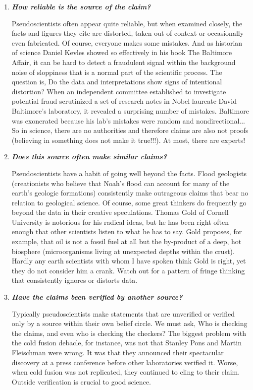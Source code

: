 	\begin{enumerate}
		\item \textit{\textbf{How reliable is the source of the claim?}}

		Pseudoscientists often appear quite reliable, but when examined closely, the facts and figures they cite are distorted, taken out of context or occasionally even fabricated. Of course, everyone makes some mistakes. And as historian of science Daniel Kevles showed so effectively in his book The Baltimore Affair, it can be hard to detect a fraudulent signal within the background noise of sloppiness that is a normal part of the scientific process. The question is, Do the data and interpretations show signs of intentional distortion? When an independent committee established to investigate potential fraud scrutinized a set of research notes in Nobel laureate David Baltimore's laboratory, it revealed a surprising number of mistakes. Baltimore was exonerated because his lab's mistakes were random and nondirectional... So in science, there are no authorities and therefore claims are also not proofs (believing in something does not make it true!!!). At most, there are experts!

		\item \textit{\textbf{Does this source often make similar claims?}}

		Pseudoscientists have a habit of going well beyond the facts. Flood geologists (creationists who believe that Noah's flood can account for many of the earth's geologic formations) consistently make outrageous claims that bear no relation to geological science. Of course, some great thinkers do frequently go beyond the data in their creative speculations. Thomas Gold of Cornell University is notorious for his radical ideas, but he has been right often enough that other scientists listen to what he has to say. Gold proposes, for example, that oil is not a fossil fuel at all but the by-product of a deep, hot biosphere (microorganisms living at unexpected depths within the crust). Hardly any earth scientists with whom I have spoken think Gold is right, yet they do not consider him a crank. Watch out for a pattern of fringe thinking that consistently ignores or distorts data.

		\item \textit{\textbf{Have the claims been verified by another source?}}

		Typically pseudoscientists make statements that are unverified or verified only by a source within their own belief circle. We must ask, Who is checking the claims, and even who is checking the checkers? The biggest problem with the cold fusion debacle, for instance, was not that Stanley Pons and Martin Fleischman were wrong. It was that they announced their  spectacular discovery at a press conference before other laboratories verified it. Worse, when cold fusion was not replicated, they continued to cling to their claim. Outside verification is crucial to good science.


\end{enumerate}
